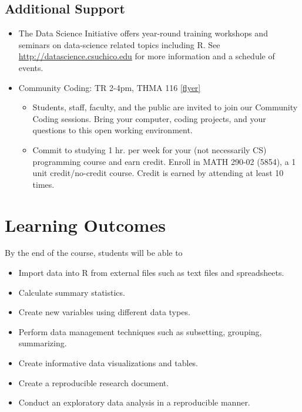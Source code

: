 \documentclass[11pt,]{article}
\providecommand{\tightlist}{%
  \setlength{\itemsep}{0pt}\setlength{\parskip}{0pt}}
\begin{document}
\hypertarget{additional-support}{%
\subsection{Additional Support}\label{additional-support}}

\begin{itemize}
\tightlist
\item
  The Data Science Initiative offers year-round training workshops and
  seminars on data-science related topics including R. See
  \url{http://datascience.csuchico.edu} for more information and a
  schedule of events.\\
\item
  Community Coding: TR 2-4pm, THMA 116
  \href{cc_flyer_s19.pdf}{{[}flyer{]}}

  \begin{itemize}
  \tightlist
  \item
    Students, staff, faculty, and the public are invited to join our
    Community Coding sessions. Bring your computer, coding projects, and
    your questions to this open working environment.
  \item
    Commit to studying 1 hr. per week for your (not necessarily CS)
    programming course and earn credit. Enroll in MATH 290-02 (5854), a
    1 unit credit/no-credit course. Credit is earned by attending at
    least 10 times.
  \end{itemize}
\end{itemize}

\hypertarget{learning-outcomes}{%
\section{Learning Outcomes}\label{learning-outcomes}}

By the end of the course, students will be able to

\begin{itemize}
\tightlist
\item
  Import data into R from external files such as text files and
  spreadsheets.
\item
  Calculate summary statistics.
\item
  Create new variables using different data types.
\item
  Perform data management techniques such as subsetting, grouping,
  summarizing.
\item
  Create informative data visualizations and tables.
\item
  Create a reproducible research document.
\item
  Conduct an exploratory data analysis in a reproducible manner.
\end{itemize}
\end{document}
